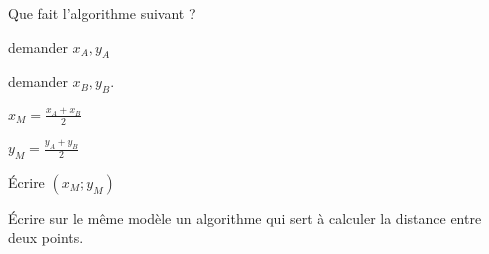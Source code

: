
\begin{exercice}\label{exosmath-0696}

    Que fait l'algorithme suivant ?

    \begin{fmpage}{0.9\linewidth}
        demander \( x_A,y_A\)

        demander \( x_B,y_B\).

        \( x_M=\frac{ x_A+x_B }{2}\)

        \( y_M=\frac{ y_A+y_B }{ 2 }\)

        Écrire \( (x_M;y_M)\)
    \end{fmpage}

    Écrire sur le même modèle un algorithme qui sert à calculer la distance entre deux points.

\end{exercice}
